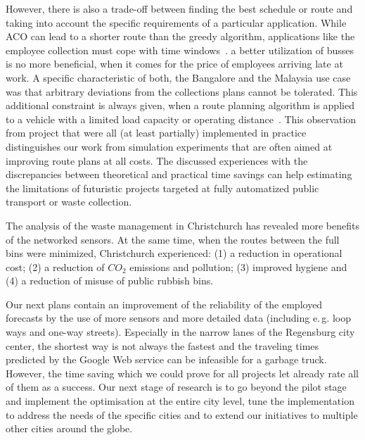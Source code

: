 \documentclass[10pt]{article}
\begin{document}
However, there is also a trade-off between finding the best schedule or route and taking into
account the specific requirements of a particular application. While ACO can lead to a shorter 
route than the greedy algorithm, applications like the employee collection must
cope with time windows~\cite{Kirci16}. a better utilization of busses is no more 
beneficial, when it comes for the price of employees arriving late at work. A specific characteristic
of both, the Bangalore and the Malaysia use case was that arbitrary deviations from the  
collections plans cannot be tolerated. This additional constraint is always given,
when a route planning algorithm is applied to a vehicle with a limited load capacity
or operating distance~\cite{Wang17}.
This observation from project that were all (at least partially) implemented in 
practice distinguishes our work from simulation experiments that are often aimed
at improving route plans at all costs. The discussed experiences with the
discrepancies between theoretical and practical time savings can help
estimating the limitations of futuristic projects targeted at fully 
automatized public transport or waste collection.

The analysis of the waste management in Christchurch has revealed more
benefits of the networked sensors. At the same time, when the routes
between the full bins were minimized, Christchurch experienced: 
(1) a reduction in operational cost; (2) a reduction of $CO_2$ 
emissions and pollution; (3) improved hygiene and 
(4) a reduction of misuse of public rubbish bins.

Our next plans contain an improvement of the reliability of the employed 
forecasts by the use of more sensors and more detailed data (including e.\,g. 
loop ways and one-way streets). Especially in the narrow lanes of the 
Regensburg city center, the shortest way is not always the fastest and
the traveling times predicted by the Google Web service can be infeasible
for a garbage truck. However, the time saving which we could prove for all
projects let already rate all of them as a success. 
Our next stage of research is to go beyond the pilot stage and implement 
the optimisation at the entire city level, tune the implementation to address 
the needs of the specific cities and to extend our initiatives to multiple 
other cities around the globe.








\end{document}
